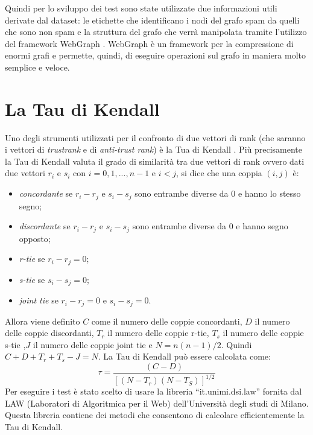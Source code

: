 Quindi per lo sviluppo dei test sono state utilizzate due informazioni utili derivate dal dataset: le etichette che identificano i nodi del grafo spam da quelli che sono non spam e la struttura del grafo che verrà manipolata tramite l'utilizzo del framework WebGraph \cite{Boldi03thewebgraph}. WebGraph è un framework per la compressione di enormi grafi e permette, quindi, di eseguire operazioni sul grafo in maniera molto semplice e veloce. 

\section{La Tau di Kendall}
Uno degli strumenti utilizzati per il confronto di due vettori di rank (che saranno i vettori di \textit{trustrank} e  di \textit{anti-trust rank}) è la Tua di Kendall \cite{KendallTau}. Più precisamente la Tau di Kendall valuta il grado di similarità tra due vettori di rank ovvero dati due vettori \(r_i\) e \(s_i\) con \(i=0,1,...,n-1\) e \(i<j\), si dice che una coppia \((i,j)\) è:
\begin{itemize}
 \item \textit{concordante} se \(r_i-r_j\) e \(s_i-s_j\) sono entrambe diverse da 0 e hanno lo stesso segno;
 \item \textit{discordante} se \(r_i-r_j\) e \(s_i-s_j\) sono entrambe diverse da 0 e hanno segno opposto;
 \item \textit{r-tie} se \(r_i-r_j=0\);
 \item \textit{s-tie} se \(s_i-s_j=0\);
 \item \textit{joint tie} se \(r_i-r_j=0\) e \(s_i-s_j=0\).
\end{itemize}
Allora viene definito  \(C\) come il numero delle coppie concordanti, \(D\) il numero delle coppie discordanti, \(T_r\) il numero delle coppie r-tie, \(T_s\) il numero delle coppie s-tie ,\(J\) il numero delle coppie joint tie e \(N=n(n-1)/2\). Quindi \(C+D+T_r+T_s-J = N\). La Tau di Kendall può essere calcolata come:
\begin{equation}
 \tau = \frac{(C-D)}{[(N-T_r)(N-T_S)]^{1/2}}
\end{equation}
Per eseguire i test è stato scelto di usare la libreria  ``it.unimi.dsi.law'' \cite{libreriaLaw} fornita dal LAW (Laboratori di Algoritmica per il Web) dell'Università degli studi di Milano. Questa libreria contiene dei metodi che consentono di calcolare efficientemente la Tau di Kendall.

